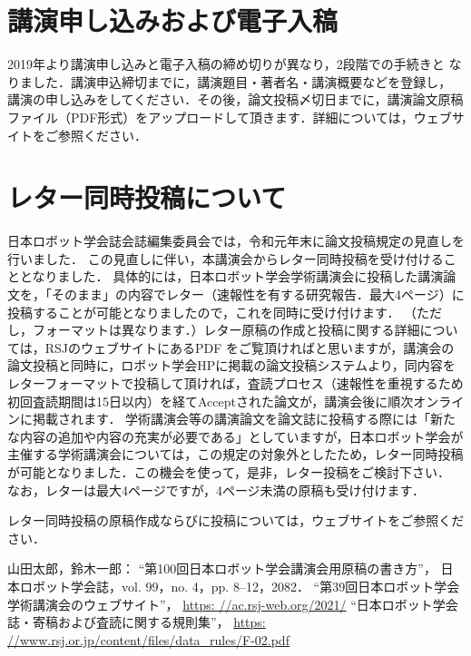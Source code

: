 \documentclass[a4paper]{jarticle}  %
\begin{document}
\section{講演申し込みおよび電子入稿}
2019年より講演申し込みと電子入稿の締め切りが異なり，2段階での手続きと
なりました．講演申込締切までに，講演題目・著者名・講演概要などを登録し，
講演の申し込みをしてください．その後，論文投稿〆切日までに，講演論文原稿ファイル（PDF形式）をアップロードして頂きます．詳細については，ウェブサイトをご参照ください．

\section{レター同時投稿について}

日本ロボット学会誌会誌編集委員会では，令和元年末に論文投稿規定の見直しを行いました．
この見直しに伴い，本講演会からレター同時投稿を受け付けることとなりました．
具体的には，日本ロボット学会学術講演会に投稿した講演論文を，「そのまま」の内容でレター（速報性を有する研究報告．最大4ページ）に投稿することが可能となりましたので，これを同時に受け付けます．
（ただし，フォーマットは異なります．）レター原稿の作成と投稿に関する詳細については，RSJのウェブサイトにあるPDF\cite{rsj_rules}
をご覧頂ければと思いますが，講演会の論文投稿と同時に，ロボット学会HPに掲載の論文投稿システムより，同内容をレターフォーマットで投稿して頂ければ，査読プロセス（速報性を重視するため初回査読期間は15日以内）を経てAcceptされた論文が，講演会後に順次オンラインに掲載されます．
学術講演会等の講演論文を論文誌に投稿する際には「新たな内容の追加や内容の充実が必要である」としていますが，日本ロボット学会が主催する学術講演会については，この規定の対象外としたため，レター同時投稿が可能となりました．この機会を使って，是非，レター投稿をご検討下さい． なお，レターは最大4ページですが，4ページ未満の原稿も受け付けます．

レター同時投稿の原稿作成ならびに投稿については，ウェブサイト\cite{website}をご参照ください．


\small
\begin{thebibliography}{9}

  山田太郎，鈴木一郎：
  ``第100回日本ロボット学会講演会用原稿の書き方''，
  日本ロボット学会誌，vol. 99，no. 4，pp. 8--12，2082．
  ``第39回日本ロボット学会学術講演会のウェブサイト''，
  \url{https: //ac.rsj-web.org/2021/}
  ``日本ロボット学会誌・寄稿および査読に関する規則集''，
  \url{https: //www.rsj.or.jp/content/files/data_rules/F-02.pdf}

\end{thebibliography}
\normalsize
\end{document}
